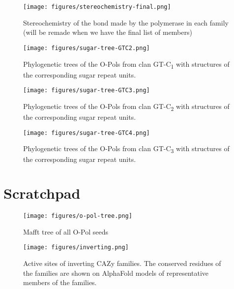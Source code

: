 \documentclass{article}
\begin{document}
\begin{figure}
    \centering
    \texttt{[image: figures/stereochemistry-final.png]}
    \caption{Stereochemistry of the bond made by the polymerase in each family (will be remade when we have the final list of members)}
    \label{fig:stereochemistry-barplot}
\end{figure}

\begin{figure}[htbp]
    \centering
    \texttt{[image: figures/sugar-tree-GTC2.png]}
    \caption{Phylogenetic trees of the O-Pols from clan GT-C\textsubscript{1} with structures of the corresponding sugar repeat units.}
    \label{fig:sugar-tree-GTC2}
\end{figure}

\begin{figure}[htbp]
    \centering
    \texttt{[image: figures/sugar-tree-GTC3.png]}
    \caption{Phylogenetic trees of the O-Pols from clan GT-C\textsubscript{2} with structures of the corresponding sugar repeat units.}
    \label{fig:sugar-tree-GTC3}
\end{figure}

\begin{figure}[htbp]
    \centering
    \texttt{[image: figures/sugar-tree-GTC4.png]}
    \caption{Phylogenetic trees of the O-Pols from clan GT-C\textsubscript{3} with structures of the corresponding sugar repeat units.}
    \label{fig:sugar-tree-GTC4}
\end{figure}

\clearpage

\section{Scratchpad}

\begin{figure}[htbp]
    \centering
    \texttt{[image: figures/o-pol-tree.png]}
    \caption{Mafft tree of all O-Pol seeds}
    \label{fig:o-pol-seed-tree}
\end{figure}

\begin{figure}[htbp]
    \centering
    \texttt{[image: figures/inverting.png]}
    \caption{Active sites of inverting CAZy families. The conserved residues of the families are shown on AlphaFold models of representative members of the families.}
    \label{fig:inverting-active-sites}
\end{figure}
\end{document}
